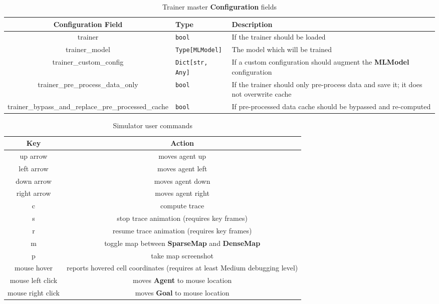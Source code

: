 \begin{appendices}
\begin{table}[h!]
    \footnotesize
    \centerfloat
    \begin{tabular}{|c|M{2.2cm}|M{4.5cm}|}
        \hline
        \textbf{Configuration Field} & \textbf{Type} & \textbf{Description} \\
        \hline
        trainer & \texttt{bool} & If the trainer should be loaded \\
        \hline
        trainer\_model & \texttt{Type[MLModel]} & The model which will be trained \\
        \hline
        trainer\_custom\_config & \texttt{Dict[str, Any]} & If a custom configuration should augment the \textbf{MLModel} configuration \\
        \hline
        trainer\_pre\_process\_data\_only & \texttt{bool} & If the trainer should only pre-process data and save it; it does not overwrite cache\\
        \hline
        trainer\_bypass\_and\_replace\_pre\_processed\_cache & \texttt{bool} & If pre-processed data cache should be bypassed and re-computed \\
        \hline
    \end{tabular}
    \caption{Trainer master \textbf{Configuration} fields}
    \label{tab: trainer_master_config}
\end{table}

\begin{table}[h!]
    \centerfloat
    \begin{tabular}{|c|c|}
        \hline
        \textbf{Key} & \textbf{Action} \\
        \hline
        up arrow & moves agent up \\
        \hline
        left arrow & moves agent left \\
        \hline
        down arrow & moves agent down \\
        \hline
        right arrow & moves agent right \\
        \hline
        c & compute trace \\
        \hline
        s & stop trace animation (requires key frames) \\
        \hline
        r & resume trace animation (requires key frames) \\
        \hline
        m & toggle map between \textbf{SparseMap} and \textbf{DenseMap} \\
        \hline
        p & take map screenshot \\
        \hline
        mouse hover & reports hovered cell coordinates (requires at least Medium debugging level) \\
        \hline
        mouse left click & moves \textbf{Agent} to mouse location \\
        \hline
        mouse right click & moves \textbf{Goal} to mouse location \\
        \hline
    \end{tabular}
    \caption{Simulator user commands}
    \label{tab: sim_commands}
\end{table}




\end{appendices}
